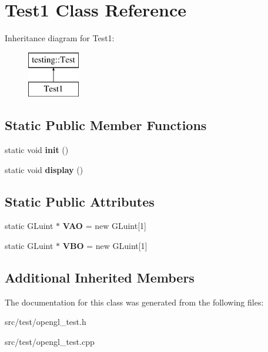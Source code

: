 \hypertarget{class_test1}{}\section{Test1 Class Reference}
\label{class_test1}
Inheritance diagram for Test1\+:\begin{figure}[H]
\begin{center}
\leavevmode
\includegraphics[height=2.000000cm]{class_test1}
\end{center}
\end{figure}
\subsection*{Static Public Member Functions}
\begin{DoxyCompactItemize}
\item 
\hypertarget{class_test1_a7d36718d0baec0b5a96b33dadee695c2}{}static void {\bfseries init} ()\label{class_test1_a7d36718d0baec0b5a96b33dadee695c2}

\item 
\hypertarget{class_test1_ab574a5869ab0af072f5047fa396a5af9}{}static void {\bfseries display} ()\label{class_test1_ab574a5869ab0af072f5047fa396a5af9}

\end{DoxyCompactItemize}
\subsection*{Static Public Attributes}
\begin{DoxyCompactItemize}
\item 
\hypertarget{class_test1_aad528bbab0c48086d4bf59100d36e0b1}{}static G\+Luint $\ast$ {\bfseries V\+A\+O} = new G\+Luint\mbox{[}1\mbox{]}\label{class_test1_aad528bbab0c48086d4bf59100d36e0b1}

\item 
\hypertarget{class_test1_ab027878a7b35af15e679b223c0bdf64d}{}static G\+Luint $\ast$ {\bfseries V\+B\+O} = new G\+Luint\mbox{[}1\mbox{]}\label{class_test1_ab027878a7b35af15e679b223c0bdf64d}

\end{DoxyCompactItemize}
\subsection*{Additional Inherited Members}


The documentation for this class was generated from the following files\+:\begin{DoxyCompactItemize}
\item 
src/test/opengl\+\_\+test.\+h\item 
src/test/opengl\+\_\+test.\+cpp\end{DoxyCompactItemize}
